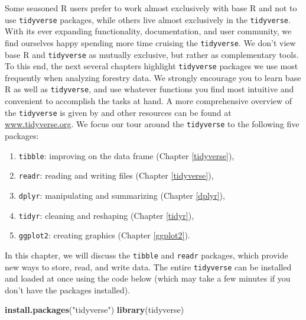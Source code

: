 \documentclass[
  11pt,
]{krantz}
\newenvironment{Shaded}{\begin{snugshade}}{\end{snugshade}}
\newcommand{\KeywordTok}[1]{\textcolor[rgb]{0.13,0.29,0.53}{\textbf{#1}}}
\newcommand{\NormalTok}[1]{#1}
\newcommand{\StringTok}[1]{\textcolor[rgb]{0.31,0.60,0.02}{#1}}
\providecommand{\tightlist}{%
  \setlength{\itemsep}{0pt}\setlength{\parskip}{0pt}}
\theoremstyle{definition}
\theoremstyle{definition}
\theoremstyle{definition}
\theoremstyle{definition}
\theoremstyle{remark}
\begin{document}
Some seasoned R users prefer to work almost exclusively with base R and not to use \texttt{tidyverse} packages, while others live almost exclusively in the \texttt{tidyverse}. With its ever expanding functionality, documentation, and user community, we find ourselves happy spending more time cruising the \texttt{tidyverse}. We don't view base R and \texttt{tidyverse} as mutually exclusive, but rather as complementary tools. To this end, the next several chapters highlight \texttt{tidyverse} packages we use most frequently when analyzing forestry data. We strongly encourage you to learn base R as well as \texttt{tidyverse}, and use whatever functions you find most intuitive and convenient to accomplish the tasks at hand. A more comprehensive overview of the \texttt{tidyverse} is given by \citet{wickham2023} and other resources can be found at \url{www.tidyverse.org}. We focus our tour around the \texttt{tidyverse} to the following five packages:

\begin{enumerate}
\def\labelenumi{\arabic{enumi}.}
\tightlist
\item
  \texttt{tibble}: improving on the data frame (Chapter \ref{tidyverse}),
\item
  \texttt{readr}: reading and writing files (Chapter \ref{tidyverse}),
\item
  \texttt{dplyr}: manipulating and summarizing (Chapter \ref{dplyr}),
\item
  \texttt{tidyr}: cleaning and reshaping (Chapter \ref{tidyr}),
\item
  \texttt{ggplot2}: creating graphics (Chapter \ref{ggplot2}).
\end{enumerate}

In this chapter, we will discuss the \texttt{tibble} and \texttt{readr} packages, which provide new ways to store, read, and write data. The entire \texttt{tidyverse} can be installed and loaded at once using the code below (which may take a few minutes if you don't have the packages installed).

\begin{Shaded}
\begin{Highlighting}[]
\KeywordTok{install.packages}\NormalTok{(}\StringTok{"tidyverse"}\NormalTok{) }
\KeywordTok{library}\NormalTok{(tidyverse) }
\end{Highlighting}
\end{Shaded}
\end{document}
